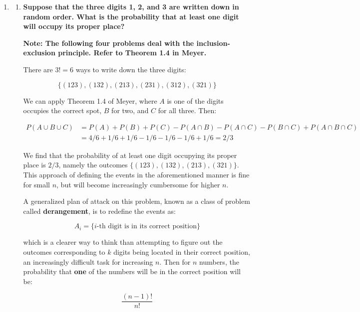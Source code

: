 \documentclass[10pt, oneside]{article}
\begin{document}
\begin{enumerate}[label=2.\arabic*]
\begin{enumerate}
	In both (a) and (b), the combination approach proved simpler. 
	\end{enumerate}
	
\item \begin{enumerate}
	\item \begin{tcolorbox}[
  colback=Cerulean!5!white,
  colframe=Cerulean!75!black]
	\textbf{Suppose that the three digits 1, 2, and 3 are written down in random order. What is the probability that at least one digit will occupy its proper place?}
	\end{tcolorbox}
	
	\textbf{Note: The following four problems deal with the inclusion-exclusion principle. Refer to Theorem 1.4 in Meyer.}
	
	There are $3! = 6$ ways to write down the three digits:
	
	\[ \{ (123), (132), (213), (231), (312), (321) \} \]
	
	We can apply Theorem 1.4 of Meyer, where $A$ is one of the digits occupies the correct spot, $B$ for two, and $C$ for all three. Then:
	
	\begin{align*}
	P(A \cup B \cup C) &= P(A) + P(B) + P(C) - P(A \cap B) - P(A \cap C) - P(B \cap C) + P(A \cap B \cap C) \\
	&= 4/6 + 1/6 + 1/6 - 1/6 - 1/6 - 1/6 + 1/6 = \boxed{2/3}
	\end{align*}
	
	We find that the probability of at least one digit occupying its proper place is $\boxed{2/3}$, namely the outcomes $\{ (123), (132), (213), (321)\}$. This approach of defining the events in the aforementioned manner is fine for small $n$, but will become increasingly cumbersome for higher $n$.
	
	A generalized plan of attack on this problem, known as a class of problem called \textbf{derangement}, is to redefine the events as:
	
	\[ A_i = \{ \text{$i$-th digit is in its correct position} \} \]
	
	which is a clearer way to think than attempting to figure out the outcomes corresponding to $k$ digits being located in their correct position, an increasingly difficult task for increasing $n$. Then for $n$ numbers, the 	probability that \textbf{one} of the numbers will be in the correct position will be:
	
	\[ \frac{(n-1)!}{n!} \]
	

\end{enumerate}
\end{enumerate}
\end{document}
